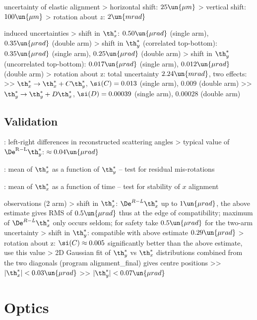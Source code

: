 \> uncertainty of elastic alignment
\>> horizontal shift: $25\un{\mu m}$
\>> vertical shift: $100\un{\mu m}$
\>> rotation about $z$: $2\un{mrad}$

\> induced uncertainties
\>> shift in $\th_x^*$: $0.50\un{\mu rad}$ (single arm), $0.35\un{\mu rad}$ (double arm)
\>> shift in $\th_y^*$ (correlated top-bottom): $0.35\un{\mu rad}$ (single arm), $0.25\un{\mu rad}$ (double arm)
\>> shift in $\th_y^*$ (uncorrelated top-bottom): $0.017\un{\mu rad}$ (single arm), $0.012\un{\mu rad}$ (double arm)
\>> rotation about z: total uncertainty $2.24\un{mrad}$, two effects:
\>>> $\th_x^* \rightarrow \th_x^* + C \th_y^*$, $\si(C) = 0.013$ (single arm), $0.009$ (double arm)
\>>> $\th_y^* \rightarrow \th_y^* + D \th_x^*$, $\si(D) = 0.00039$ (single arm), $0.00028$ (double arm)

\section[alignment-val]{Validation}

\> : left-right differences in reconstructed scattering angles
\>> typical value of $\De^{\rm R-L}\th^*_y$: $\approx 0.04\un{\mu rad}$

\> : mean of $\th_x^*$ as a function of $\th_y^*$ -- test for residual mis-rotations

\> :  mean of $\th_x^*$ as a function of time -- test for stability of $x$ alignment

\> observations (2 arm)
\>> shift in $\th_x^*$: $\De^{R-L} \th_x^*$ up to $1\un{\mu rad}$, the above estimate gives RMS of $0.5\un{\mu rad}$ thus at the edge of compatibility; maximum of $\De^{R-L} \th_x^*$ only occurs seldom; for safety take $0.5\un{\mu rad}$ for the two-arm uncertainty
\>> shift in $\th_y^*$: compatible with above estimate $0.29\un{\mu rad}$
\>> rotation about z: $\si(C) \approx 0.005$ significantly better than the above estimate, use this value
\>> 2D Gaussian fit of $\th^*_y$ vs $\th^*_x$ distributions combined from the two diagonals (program alignment\_final) gives centre positions
\>>> $|\th^*_x| < 0.03\un{\mu rad}$
\>>> $|\th^*_y| < 0.07\un{\mu rad}$



\chapter[optics]{Optics}

